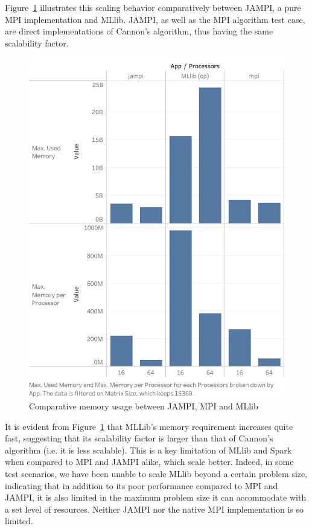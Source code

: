 \documentclass[fleqn,10pt]{SelfArx} %
\begin{document}
Figure~\ref{fig:memory_usage} illustrates this scaling behavior comparatively between JAMPI, a pure MPI implementation and MLlib. JAMPI, as well as the MPI algorithm test case, are direct implementations of Cannon's algorithm, thus having the same scalability factor. 

\begin{figure}
	\centering
	\includegraphics[width=0.9\linewidth]{figures/memory.png}
	\vspace{14pt}
	\caption{Comparative memory usage between JAMPI, MPI and MLlib}
	\label{fig:memory_usage}
\end{figure}

It is evident from Figure~\ref{fig:memory_usage} that MLLib's memory requirement increases quite fast, suggesting that its scalability factor is larger than that of Cannon's algorithm (i.e. it is less scalable). This is a key limitation of MLlib and Spark when compared to MPI and JAMPI alike, which scale better. Indeed, in some test scenarios, we have been unable to scale MLlib beyond a certain problem size, indicating that in addition to its poor performance compared to MPI and JAMPI, it is also limited in the maximum problem size it can accommodate with a set level of resources. Neither JAMPI nor the native MPI implementation is so limited.
\end{document}
